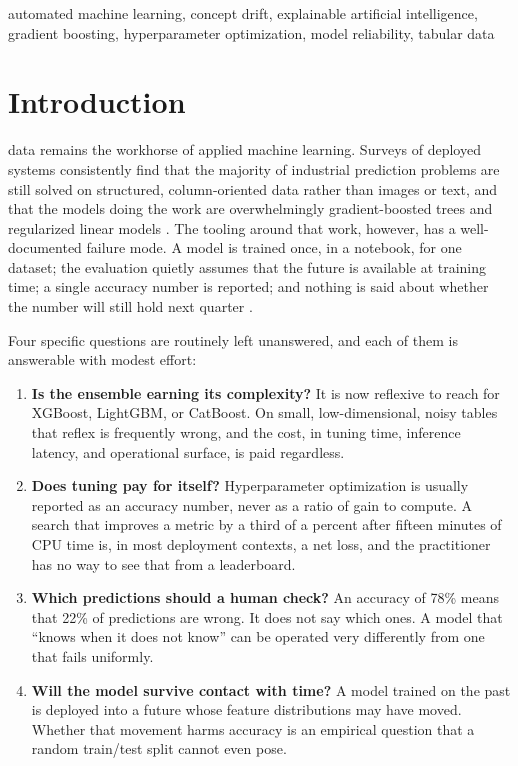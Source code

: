 \documentclass{ieeeaccess}
\begin{document}
\begin{keywords}
automated machine learning, concept drift, explainable artificial intelligence, gradient boosting, hyperparameter optimization, model reliability, tabular data
\end{keywords}

\titlepgskip=-15pt

\maketitle

\section{Introduction}
\label{sec:introduction}
 data remains the workhorse of applied machine learning. Surveys of deployed systems consistently find that the majority of industrial prediction problems are still solved on structured, column-oriented data rather than images or text, and that the models doing the work are overwhelmingly gradient-boosted trees and regularized linear models \cite{shwartz2022tabular,grinsztajn2022tree}. The tooling around that work, however, has a well-documented failure mode. A model is trained once, in a notebook, for one dataset; the evaluation quietly assumes that the future is available at training time; a single accuracy number is reported; and nothing is said about whether the number will still hold next quarter \cite{sculley2015hidden,paleyes2022challenges}.

Four specific questions are routinely left unanswered, and each of them is answerable with modest effort:

\begin{enumerate}
\item \textbf{Is the ensemble earning its complexity?} It is now reflexive to reach for XGBoost, LightGBM, or CatBoost. On small, low-dimensional, noisy tables that reflex is frequently wrong, and the cost, in tuning time, inference latency, and operational surface, is paid regardless.
\item \textbf{Does tuning pay for itself?} Hyperparameter optimization is usually reported as an accuracy number, never as a ratio of gain to compute. A search that improves a metric by a third of a percent after fifteen minutes of CPU time is, in most deployment contexts, a net loss, and the practitioner has no way to see that from a leaderboard.
\item \textbf{Which predictions should a human check?} An accuracy of 78\% means that 22\% of predictions are wrong. It does not say which ones. A model that ``knows when it does not know'' can be operated very differently from one that fails uniformly.
\item \textbf{Will the model survive contact with time?} A model trained on the past is deployed into a future whose feature distributions may have moved. Whether that movement harms accuracy is an empirical question that a random train/test split cannot even pose.
\end{enumerate}
\end{document}
